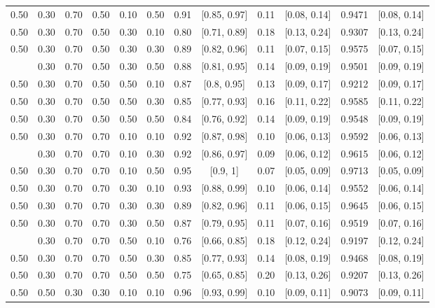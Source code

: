 \documentclass[
  11pt,
]{article}
\begin{document}
\begin{landscape}
\begin{ThreePartTable}
\begin{longtable}[t]{cccccccccccc}
0.50 & 0.30 & 0.70 & 0.50 & 0.10 & 0.50 & 0.91 & {}[0.85, 0.97] & 0.11 & {}[0.08, 0.14] & 0.9471 & {}[0.08, 0.14]\\
0.50 & 0.30 & 0.70 & 0.50 & 0.30 & 0.10 & 0.80 & {}[0.71, 0.89] & 0.18 & {}[0.13, 0.24] & 0.9307 & {}[0.13, 0.24]\\
0.50 & 0.30 & 0.70 & 0.50 & 0.30 & 0.30 & 0.89 & {}[0.82, 0.96] & 0.11 & {}[0.07, 0.15] & 0.9575 & {}[0.07, 0.15]\\
\addlinespace
0.50 & 0.30 & 0.70 & 0.50 & 0.30 & 0.50 & 0.88 & {}[0.81, 0.95] & 0.14 & {}[0.09, 0.19] & 0.9501 & {}[0.09, 0.19]\\
0.50 & 0.30 & 0.70 & 0.50 & 0.50 & 0.10 & 0.87 & {}[0.8, 0.95] & 0.13 & {}[0.09, 0.17] & 0.9212 & {}[0.09, 0.17]\\
0.50 & 0.30 & 0.70 & 0.50 & 0.50 & 0.30 & 0.85 & {}[0.77, 0.93] & 0.16 & {}[0.11, 0.22] & 0.9585 & {}[0.11, 0.22]\\
0.50 & 0.30 & 0.70 & 0.50 & 0.50 & 0.50 & 0.84 & {}[0.76, 0.92] & 0.14 & {}[0.09, 0.19] & 0.9548 & {}[0.09, 0.19]\\
0.50 & 0.30 & 0.70 & 0.70 & 0.10 & 0.10 & 0.92 & {}[0.87, 0.98] & 0.10 & {}[0.06, 0.13] & 0.9592 & {}[0.06, 0.13]\\
\addlinespace
0.50 & 0.30 & 0.70 & 0.70 & 0.10 & 0.30 & 0.92 & {}[0.86, 0.97] & 0.09 & {}[0.06, 0.12] & 0.9615 & {}[0.06, 0.12]\\
0.50 & 0.30 & 0.70 & 0.70 & 0.10 & 0.50 & 0.95 & {}[0.9, 1] & 0.07 & {}[0.05, 0.09] & 0.9713 & {}[0.05, 0.09]\\
0.50 & 0.30 & 0.70 & 0.70 & 0.30 & 0.10 & 0.93 & {}[0.88, 0.99] & 0.10 & {}[0.06, 0.14] & 0.9552 & {}[0.06, 0.14]\\
0.50 & 0.30 & 0.70 & 0.70 & 0.30 & 0.30 & 0.89 & {}[0.82, 0.96] & 0.11 & {}[0.06, 0.15] & 0.9645 & {}[0.06, 0.15]\\
0.50 & 0.30 & 0.70 & 0.70 & 0.30 & 0.50 & 0.87 & {}[0.79, 0.95] & 0.11 & {}[0.07, 0.16] & 0.9519 & {}[0.07, 0.16]\\
\addlinespace
0.50 & 0.30 & 0.70 & 0.70 & 0.50 & 0.10 & 0.76 & {}[0.66, 0.85] & 0.18 & {}[0.12, 0.24] & 0.9197 & {}[0.12, 0.24]\\
0.50 & 0.30 & 0.70 & 0.70 & 0.50 & 0.30 & 0.85 & {}[0.77, 0.93] & 0.14 & {}[0.08, 0.19] & 0.9468 & {}[0.08, 0.19]\\
0.50 & 0.30 & 0.70 & 0.70 & 0.50 & 0.50 & 0.75 & {}[0.65, 0.85] & 0.20 & {}[0.13, 0.26] & 0.9207 & {}[0.13, 0.26]\\
0.50 & 0.50 & 0.30 & 0.30 & 0.10 & 0.10 & 0.96 & {}[0.93, 0.99] & 0.10 & {}[0.09, 0.11] & 0.9073 & {}[0.09, 0.11]\\

\end{longtable}
\end{ThreePartTable}
\end{landscape}
\end{document}
